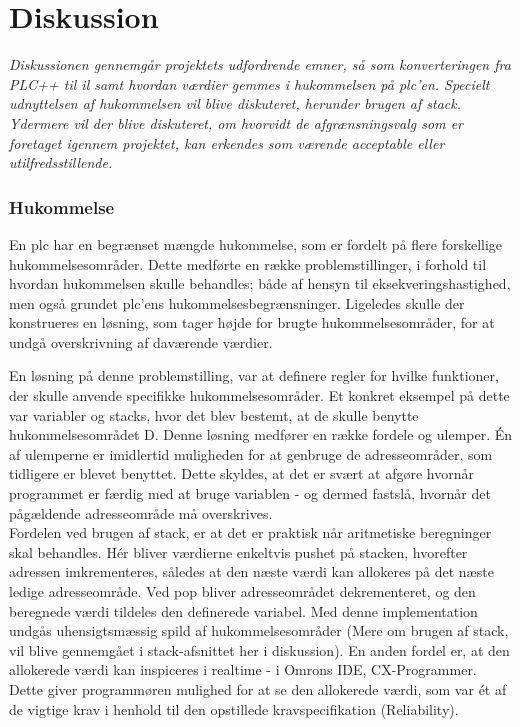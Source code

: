 \chapter{Diskussion}\label{sec:Diskussion}
\textit{Diskussionen gennemgår projektets udfordrende emner, så som konverteringen fra PLC++ til \gls{il} samt hvordan værdier gemmes i hukommelsen på \gls{plc}’en.
Specielt udnyttelsen af hukommelsen vil blive diskuteret, herunder brugen af stack. 
Ydermere vil der blive diskuteret, om hvorvidt de afgrænsningsvalg som er foretaget igennem projektet, kan erkendes som værende acceptable eller utilfredsstillende.}

\subsection*{Hukommelse}
En \gls{plc} har en begrænset mængde hukommelse, som er fordelt på flere forskellige hukommelsesområder. 
Dette medførte en række problemstillinger, i forhold til hvordan hukommelsen skulle behandles; både af hensyn til eksekveringshastighed, men også grundet \gls{plc}’ens hukommelsesbegrænsninger. Ligeledes skulle der konstrueres en løsning, som tager højde for brugte hukommelsesområder, for at undgå overskrivning af daværende værdier. 

En løsning på denne problemstilling, var at definere regler for hvilke funktioner, der skulle anvende specifikke hukommelsesområder. Et konkret eksempel på dette var variabler og stacks, hvor det blev bestemt, at de skulle benytte hukommelsesområdet D. 
Denne løsning medfører en række fordele og ulemper. Én af ulemperne er imidlertid muligheden for at genbruge de adresseområder, som tidligere er blevet benyttet. Dette skyldes, at det er svært at afgøre hvornår programmet er færdig med at bruge variablen - og dermed fastslå, hvornår det pågældende adresseområde må overskrives. \\

\noindent Fordelen ved brugen af stack, er at det er praktisk når aritmetiske beregninger skal behandles. Hér bliver værdierne enkeltvis pushet på stacken, hvorefter adressen imkrementeres, således at den næste værdi kan allokeres på det næste ledige adresseområde. Ved pop bliver adresseområdet dekrementeret, og den beregnede værdi tildeles den definerede variabel. Med denne implementation undgås uhensigtsmæssig spild af hukommelsesområder (Mere om brugen af stack, vil blive gennemgået i stack-afsnittet her i diskussion).
En anden fordel er, at den allokerede værdi kan inspiceres i realtime - i Omrons IDE, CX-Programmer. Dette giver programmøren mulighed for at se den allokerede værdi, som var ét af de vigtige krav i henhold til den opstillede kravspecifikation (Reliability). \\

